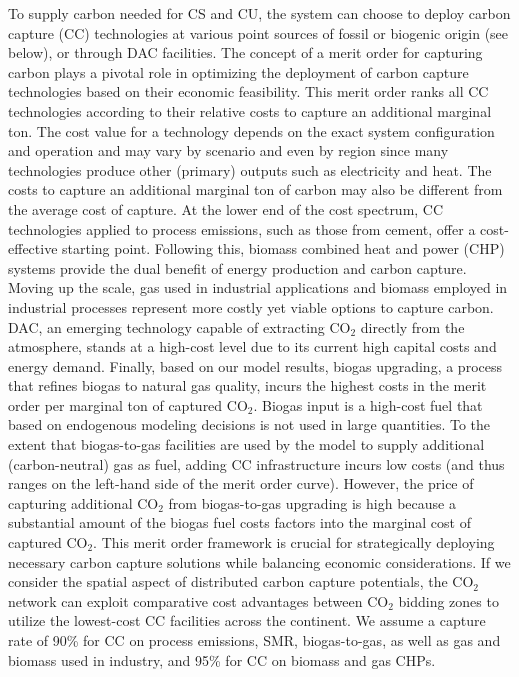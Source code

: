 \documentclass[twocolumn]{article}
\newcommand{\carbon}{CO$_2$}
\begin{document}
To supply carbon needed for CS and CU, the system can choose to deploy carbon capture (CC) technologies at various point sources of fossil or biogenic origin (see below), or through DAC facilities.
The concept of a merit order for capturing carbon plays a pivotal role in optimizing the deployment of carbon capture technologies based on their economic feasibility.
This merit order ranks all CC technologies according to their relative costs to capture an additional marginal ton. The cost value for a technology depends on the exact system configuration and operation and may vary by scenario and even by region since many technologies produce other (primary) outputs such as electricity and heat. The costs to capture an additional marginal ton of carbon may also be different from the average cost of capture.
At the lower end of the cost spectrum, CC technologies applied to process emissions, such as those from cement, offer a cost-effective starting point.
Following this, biomass combined heat and power (CHP) systems provide the dual benefit of energy production and carbon capture.
Moving up the scale, gas used in industrial applications and biomass employed in industrial processes represent more costly yet viable options to capture carbon.
DAC, an emerging technology capable of extracting \carbon{} directly from the atmosphere, stands at a high-cost level due to its current high capital costs and energy demand.
Finally, based on our model results, biogas upgrading, a process that refines biogas to natural gas quality, incurs the highest costs in the merit order per marginal ton of captured \carbon{}.
Biogas input is a high-cost fuel that based on endogenous modeling decisions is not used in large quantities.
To the extent that biogas-to-gas facilities are used by the model to supply additional (carbon-neutral) gas as fuel, adding CC infrastructure incurs low costs (and thus ranges on the left-hand side of the merit order curve).
However, the price of capturing additional \carbon{} from biogas-to-gas upgrading is high because a substantial amount of the biogas fuel costs factors into the marginal cost of captured \carbon{}.
This merit order framework is crucial for strategically deploying necessary carbon capture solutions while balancing economic considerations.
If we consider the spatial aspect of distributed carbon capture potentials, the \carbon{} network can exploit comparative cost advantages between \carbon{} bidding zones to utilize the lowest-cost CC facilities across the continent.
We assume a capture rate of 90\% for CC on process emissions, SMR, biogas-to-gas, as well as gas and biomass used in industry, and 95\% for CC on biomass and gas CHPs.
\end{document}
